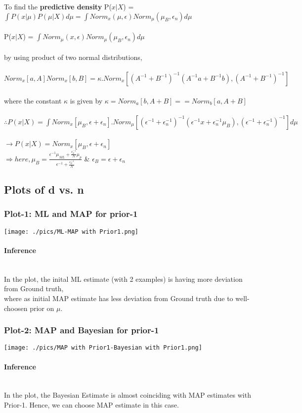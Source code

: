 \documentclass[fleqn]{article}
\newcommand{\myparagraph}[1]{\paragraph{#1}\mbox{}\\}
\begin{document}
To find the \textbf{predictive density} P($x|X$) = $\int P(x|\mu)P(\mu|X)d\mu = \int Norm_x(\mu, \epsilon)Norm_\mu(\mu_B, \epsilon_n)d\mu$\\\\
P($x|X$) = $ \int Norm_{\mu}(x, \epsilon)Norm_\mu(\mu_B, \epsilon_n)d\mu$  \\\\
by using product of two normal distributions,\\\\ $Norm_x[a, A]Norm_x[b, B] = \kappa.Norm_x[(A^{-1}+B^{-1})^{-1}(A^{-1}a+B^{-1}b), (A^{-1}+B^{-1})^{-1}]$\\\\
where the constant $\kappa$ is given by $\kappa=Norm_a[b, A+B]==Norm_b[a, A+B]$\\\\
$\therefore P(x|X) = \int Norm_x[\mu_B, \epsilon+\epsilon_n].Norm_\mu[(\epsilon^{-1}+\epsilon_n^{-1})^{-1}(\epsilon^{-1}x+\epsilon_n^{-1}\mu_B), (\epsilon^{-1}+\epsilon_n^{-1})^{-1}] d\mu $ \\\\
$\longrightarrow  P(x|X) = Norm_x[\mu_B, \epsilon+\epsilon_n]$\\
$\Longrightarrow here, \mu_{B} = \frac{\epsilon^{-1}\mu_{ML} + \frac{\epsilon_p^{-1}}{N}\mu_p}{\epsilon^{-1} + \frac{\epsilon_p^{-1}}{N}}$ \& $\epsilon_B = \epsilon + \epsilon_n$

\subsection{Plots of d vs. n}
\subsubsection{Plot-1: ML and MAP for prior-1}
\texttt{[image: ./pics/ML-MAP with Prior1.png]} \newline
\myparagraph{Inference}
In the plot, the inital ML estimate (with 2 examples) is having more deviation from Ground truth,\\
where as initial MAP estimate has less deviation from Ground truth due to well-choosen prior on $\mu$. \\
\subsubsection{Plot-2: MAP and Bayesian for prior-1}
\texttt{[image: ./pics/MAP with Prior1-Bayesian with Prior1.png]} \newline
\myparagraph{Inference}
In the plot, the Bayesian Estimate is almost coinciding with MAP estimates with Prior-1. Hence, we can choose MAP estimate in this case.\\
\end{document}
